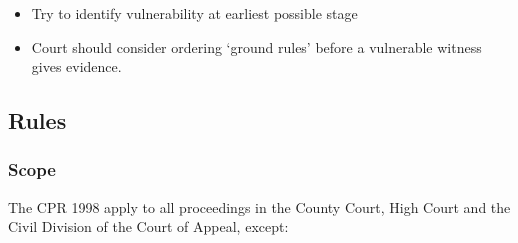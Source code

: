 \documentclass[
]{article}
\providecommand{\tightlist}{%
  \setlength{\itemsep}{0pt}\setlength{\parskip}{0pt}}
\begin{document}
\begin{itemize}
\tightlist
\item
  Try to identify vulnerability at earliest possible stage
\item
  Court should consider ordering `ground rules' before a vulnerable
  witness gives evidence.
\end{itemize}

\hypertarget{rules}{%
\subsection{Rules}\label{rules}}

\hypertarget{scope}{%
\subsubsection{Scope}\label{scope}}

The CPR 1998 apply to all proceedings in the County Court, High Court
and the Civil Division of the Court of Appeal, except:
\end{document}
